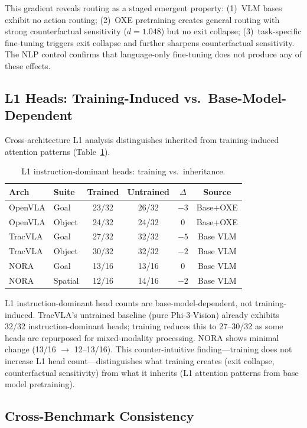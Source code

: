 \documentclass[10pt,twocolumn]{article}
\begin{document}
This gradient reveals routing as a staged emergent property: (1)~VLM bases exhibit no action routing; (2)~OXE pretraining creates general routing with strong counterfactual sensitivity ($d = 1.048$) but no exit collapse; (3)~task-specific fine-tuning triggers exit collapse and further sharpens counterfactual sensitivity.
The NLP control confirms that language-only fine-tuning does not produce any of these effects.

\subsection{L1 Heads: Training-Induced vs.\ Base-Model-Dependent}
\label{sec:l1_cross}

Cross-architecture L1 analysis distinguishes inherited from training-induced attention patterns (Table~\ref{tab:l1_cross}).

\begin{table}[t]
\centering
\caption{L1 instruction-dominant heads: training vs.\ inheritance.}
\label{tab:l1_cross}
\small
\begin{tabular}{llcccc}
\toprule
Arch & Suite & Trained & Untrained & $\Delta$ & Source \\
\midrule
OpenVLA & Goal & 23/32 & 26/32 & $-3$ & Base+OXE \\
OpenVLA & Object & 24/32 & 24/32 & 0 & Base+OXE \\
TracVLA & Goal & 27/32 & 32/32 & $-5$ & Base VLM \\
TracVLA & Object & 30/32 & 32/32 & $-2$ & Base VLM \\
NORA & Goal & 13/16 & 13/16 & 0 & Base VLM \\
NORA & Spatial & 12/16 & 14/16 & $-2$ & Base VLM \\
\bottomrule
\end{tabular}
\end{table}

L1 instruction-dominant head counts are base-model-dependent, not training-induced.
TracVLA's untrained baseline (pure Phi-3-Vision) already exhibits 32/32 instruction-dominant heads; training reduces this to 27--30/32 as some heads are repurposed for mixed-modality processing.
NORA shows minimal change (13/16 $\to$ 12--13/16).
This counter-intuitive finding---training does not increase L1 head count---distinguishes what training creates (exit collapse, counterfactual sensitivity) from what it inherits (L1 attention patterns from base model pretraining).

\subsection{Cross-Benchmark Consistency}
\label{sec:cross_benchmark}
\end{document}

